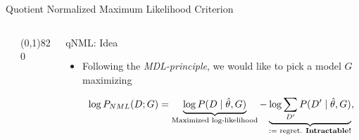 \documentclass[final]{beamer}
\newcommand{\heading}[1]{\alert{\large #1}\\}
\begin{document}
\begin{frame}{}
\begin{block}{Quotient Normalized Maximum Likelihood Criterion}
\begin{columns}[T]
\begin{column}{0.34\textwidth}
\begin{minipage}{0.49\textwidth}
   		\end{minipage}
   		
   		\vspace*{12pt}
   		
		
  
   	\end{column}
   
   \begin{column}{0.005\textwidth}\linethickness{0.3ex} %
      \color{myPurple} \line(0,1){820}
   \end{column} %
   
   \begin{column}{0.3\textwidth} %
	\heading{qNML: Idea}
	\vspace*{12pt}
	\begin{itemize}
	\item Following the \textit{MDL-principle}, we would like to pick a model $G$ maximizing

	\begin{equation}
	\log P_{NML}(D;G) = \underbrace{\log P(D \mid \hat\theta , G)}_{\text{Maximized log-likelihood}} - \underbrace{\log \sum_{D'}P(D' \mid \hat  \theta,G)}_{:= \text{ regret. } \textbf{Intractable!}}, \notag
	\end{equation}%


\end{itemize}
\end{column}
\end{columns}
\end{block}
\end{frame}
\end{document}
